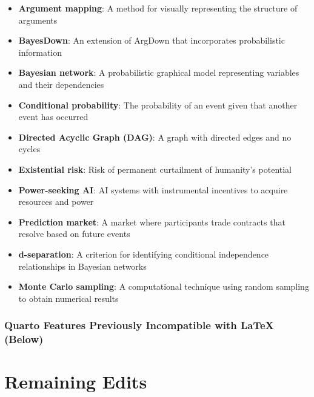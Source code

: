 \documentclass[
  11pt,
  letterpaper,
]{book}
\providecommand{\tightlist}{%
  \setlength{\itemsep}{0pt}\setlength{\parskip}{0pt}}
\begin{document}
\begin{itemize}
\tightlist
\item
  \textbf{Argument mapping}: A method for visually representing the
  structure of arguments\\
\item
  \textbf{BayesDown}: An extension of ArgDown that incorporates
  probabilistic information\\
\item
  \textbf{Bayesian network}: A probabilistic graphical model
  representing variables and their dependencies\\
\item
  \textbf{Conditional probability}: The probability of an event given
  that another event has occurred\\
\item
  \textbf{Directed Acyclic Graph (DAG)}: A graph with directed edges and
  no cycles\\
\item
  \textbf{Existential risk}: Risk of permanent curtailment of humanity's
  potential\\
\item
  \textbf{Power-seeking AI}: AI systems with instrumental incentives to
  acquire resources and power\\
\item
  \textbf{Prediction market}: A market where participants trade
  contracts that resolve based on future events\\
\item
  \textbf{d-separation}: A criterion for identifying conditional
  independence relationships in Bayesian networks\\
\item
  \textbf{Monte Carlo sampling}: A computational technique using random
  sampling to obtain numerical results
\end{itemize}

\subsection*{Quarto Features Previously Incompatible with LaTeX
(Below)}\label{quarto-features-previously-incompatible-with-latex-below}


\chapter{Remaining Edits}\label{remaining-edits}
\end{document}
